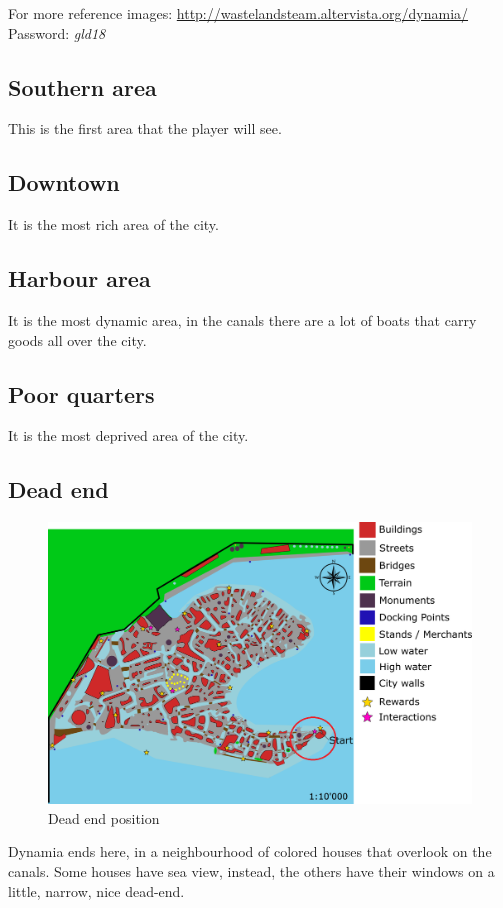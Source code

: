 For more reference images: \url{http://wastelandsteam.altervista.org/dynamia/}\\
Password: \textit{gld18}

\subsection{Southern area}
This is the first area that the player will see.

\subsection{Downtown}
It is the most rich area of the city.

\subsection{Harbour area}
It is the most dynamic area, in the canals there are a lot of boats that carry goods all over the city.

\subsection{Poor quarters}
It is the most deprived area of the city.

\subsection{Dead end}
\begin{figure}[H]
  \centering
  \includegraphics[width=12cm]{Images/Maps/dynamia_deadEnd}
  \caption{Dead end position}
\end{figure}

Dynamia ends here, in a neighbourhood of colored houses that overlook on the canals. Some houses have sea view, instead, the others have their windows on a little, narrow, nice dead-end.

